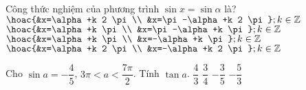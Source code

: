 \begin{ex}%
	Công thức nghiệm của phương trình $\sin x=\sin \alpha$ là?
	\choice
	{\True $\hoac{&x=\alpha+k 2 \pi \\ &x=\pi-\alpha+k 2 \pi}; k \in \mathbb{Z}$}
	{$\hoac{&x=\alpha+k \pi \\ &x=\pi-\alpha+k \pi} ; k \in \mathbb{Z}$}
	{$\hoac{&x=\alpha+k \pi \\ &x=-\alpha+k \pi} ; k \in \mathbb{Z}$}
	{$\hoac{&x=\alpha+k 2 \pi \\ &x=-\alpha+k 2 \pi} ; k \in \mathbb{Z}$}
\end{ex}

\begin{ex}%
	Cho $\sin a=-\dfrac{4}{5}$, $3\pi <a<\dfrac{7\pi}{2}$. Tính $\tan a$.
	\choice
	{\True $\dfrac{4}{3}$}
	{$\dfrac{3}{4}$}
	{$-\dfrac{3}{5}$}
	{$-\dfrac{5}{3}$}
\end{ex}


